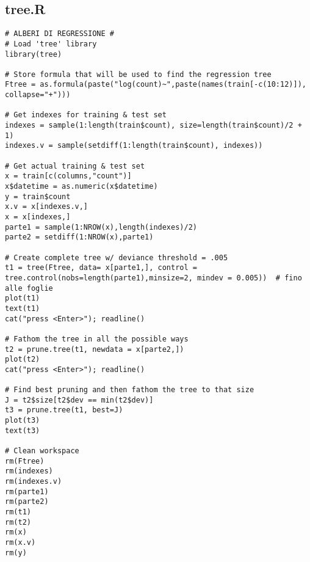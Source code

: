 \subsection{tree.R}\label{sec:tree-script}
\begin{verbatim}
# ALBERI DI REGRESSIONE #
# Load 'tree' library
library(tree)

# Store formula that will be used to find the regression tree
Ftree = as.formula(paste("log(count)~",paste(names(train[-c(10:12)]), collapse="+")))

# Get indexes for training & test set
indexes = sample(1:length(train$count), size=length(train$count)/2 + 1)
indexes.v = sample(setdiff(1:length(train$count), indexes))

# Get actual training & test set
x = train[c(columns,"count")]
x$datetime = as.numeric(x$datetime)
y = train$count
x.v = x[indexes.v,]
x = x[indexes,]
parte1 = sample(1:NROW(x),length(indexes)/2)
parte2 = setdiff(1:NROW(x),parte1)

# Create complete tree w/ deviance threshold = .005
t1 = tree(Ftree, data= x[parte1,], control = tree.control(nobs=length(parte1),minsize=2, mindev = 0.005))  # fino alle foglie
plot(t1)
text(t1)
cat("press <Enter>"); readline()

# Fathom the tree in all the possible ways
t2 = prune.tree(t1, newdata = x[parte2,])
plot(t2)
cat("press <Enter>"); readline()

# Find best pruning and then fathom the tree to that size
J = t2$size[t2$dev == min(t2$dev)]
t3 = prune.tree(t1, best=J)
plot(t3)
text(t3)

# Clean workspace
rm(Ftree)
rm(indexes)
rm(indexes.v)
rm(parte1)
rm(parte2)
rm(t1)
rm(t2)
rm(x)
rm(x.v)
rm(y)
\end{verbatim}

